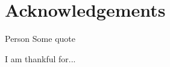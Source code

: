 \documentclass[../Main.tex]{subfiles}
\begin{document}
\chapter*{Acknowledgements}

\begin{chapquote}{Person}
    Some quote
\end{chapquote}

I am thankful for...%
\end{document}
